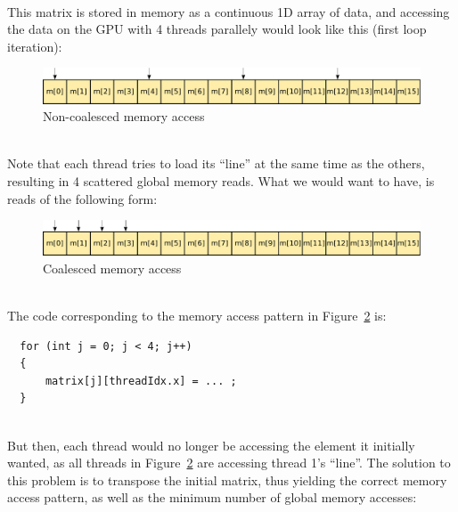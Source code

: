 \documentclass[12pt, a4paper]{report}
\begin{document}
\hspace{0pt} \\
This matrix is stored in memory as a continuous 1D array of data, and accessing
the data on the GPU with 4 threads parallely would look like this (first loop
iteration):

\begin{figure}[h]
\centering
\includegraphics[width=\linewidth]{figs/4x4_matrix_non_coalesced_memory_access}
\caption{Non-coalesced memory access}
\label{fig:4x4_matrix_non_coalesced_memory_access}
\end{figure}

\hspace{0pt} \\
Note that each thread tries to load its ``line'' at the same time as the others,
resulting in 4 scattered global memory reads.
What we would want to have, is reads of the following form:

\begin{figure}[h]
\centering
\includegraphics[width=\linewidth]{figs/4x4_matrix_coalesced_memory_access_no_transpose}
\caption{Coalesced memory access}
\label{fig:4x4_matrix_coalesced_memory_access_no_transpose}
\end{figure}

\hspace{0pt} \\
The code corresponding to the memory access pattern in
Figure~\ref{fig:4x4_matrix_coalesced_memory_access_no_transpose} is:

\begin{lstlisting}
  for (int j = 0; j < 4; j++)
  {
      matrix[j][threadIdx.x] = ... ;
  }
\end{lstlisting}

\hspace{0pt} \\
But then, each thread would no longer be accessing the element it initially
wanted, as all threads in
Figure~\ref{fig:4x4_matrix_coalesced_memory_access_no_transpose} are accessing
thread 1's ``line''.
The solution to this problem is to transpose the initial matrix, thus yielding
the correct memory access pattern, as well as the minimum number of global
memory accesses:
\end{document}
